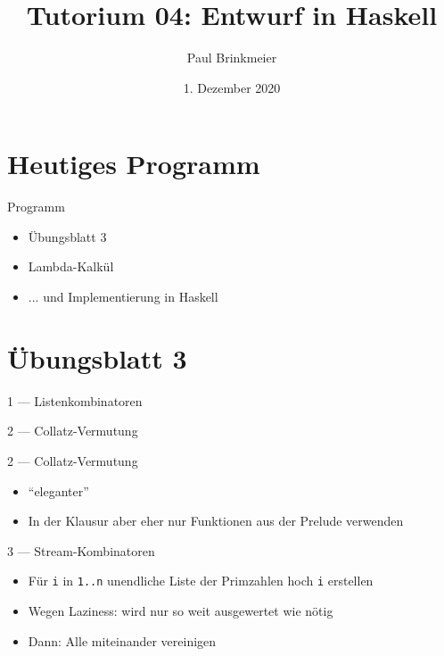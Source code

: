 \documentclass{beamer}
\title{Tutorium 04: Entwurf in Haskell}
\author{Paul Brinkmeier}
\institute{Tutorium Programmierparadigmen am KIT}
\date{1. Dezember 2020}
\begin{document}
\begin{frame}
	\titlepage
\end{frame}

\section{Heutiges Programm}
\begin{frame}{Programm}
	\begin{itemize}
		\item Übungsblatt 3
		\item Lambda-Kalkül
                \item ... und Implementierung in Haskell
	\end{itemize}
\end{frame}

\section{Übungsblatt 3}

\begin{frame}{1 --- Listenkombinatoren}
\end{frame}

\begin{frame}{2 --- Collatz-Vermutung}
\end{frame}

\begin{frame}{2 --- Collatz-Vermutung}

	\begin{itemize}
		\item \enquote{eleganter}
		\item In der Klausur aber eher nur Funktionen aus der Prelude verwenden
	\end{itemize}
\end{frame}

\begin{frame}{3 --- Stream-Kombinatoren}

	\begin{itemize}
		\item Für \texttt{i} in \texttt{1..n} unendliche Liste der Primzahlen hoch \texttt{i} erstellen
		\item Wegen Laziness: wird nur so weit ausgewertet wie nötig
		\item Dann: Alle miteinander vereinigen
	\end{itemize}
\end{frame}
\end{document}
